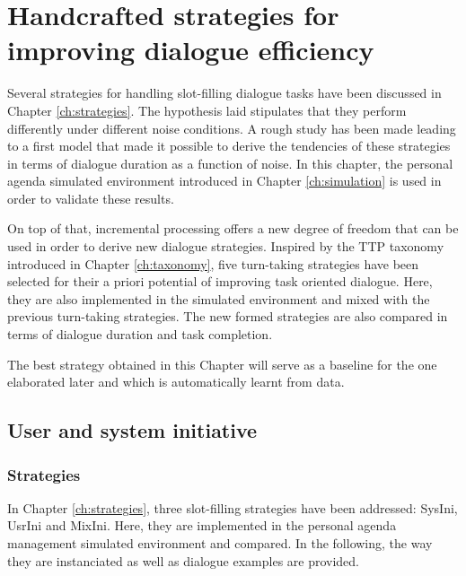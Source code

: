 \chapter{Handcrafted strategies for improving dialogue efficiency}
\label{ch:baseline}

	Several strategies for handling slot-filling dialogue tasks have been discussed in Chapter \ref{ch:strategies}. The hypothesis laid stipulates that they perform differently under different noise conditions. A rough study has been made leading to a first model that made it possible to derive the tendencies of these strategies in terms of dialogue duration as a function of noise. In this chapter, the personal agenda simulated environment introduced in Chapter \ref{ch:simulation} is used in order to validate these results.
	
	On top of that, incremental processing offers a new degree of freedom that can be used in order to derive new dialogue strategies. Inspired by the TTP taxonomy introduced in Chapter \ref{ch:taxonomy}, five turn-taking strategies have been selected for their a priori potential of improving task oriented dialogue. Here, they are also implemented in the simulated environment and mixed with the previous turn-taking strategies. The new formed strategies are also compared in terms of dialogue duration and task completion.
	
	The best strategy obtained in this Chapter will serve as a baseline for the one elaborated later and which is automatically learnt from data.

\section{User and system initiative}
	\subsection{Strategies}
  \label{subsec:strategies}
				
				In Chapter \ref{ch:strategies}, three slot-filling strategies have been addressed: SysIni, UsrIni and MixIni. Here, they are implemented in the personal agenda management simulated environment and compared. In the following, the way they are instanciated as well as dialogue examples are provided.

